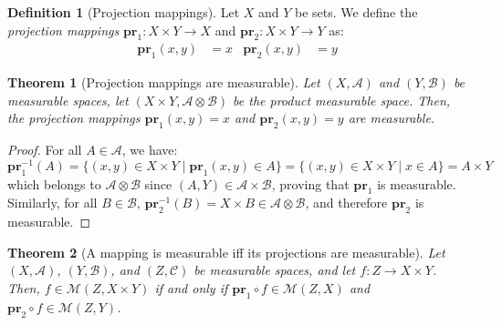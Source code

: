 \documentclass{article}
\newtheorem{theorem}{Theorem}[section]
\theoremstyle{definition}
\newtheorem{definition}{Definition}[section]
\theoremstyle{remark}
\theoremstyle{example}
\theoremstyle{notation}
\newcommand{\pr}{\mathbf{pr}}
\begin{document}
\begin{definition}[Projection mappings]
		Let $X$ and $Y$ be sets. We define the \textit{projection mappings} $\pr_1 : X \times Y \rightarrow X$ and $\pr_2 : X \times Y \rightarrow Y$ as:
		\begin{align*}
				\pr_1(x, y) &= x & \pr_2(x, y) &= y
		\end{align*}
\end{definition}

\begin{theorem}[Projection mappings are measurable]
		Let $(X, \mathcal{A})$ and $(Y, \mathcal{B})$ be measurable spaces, let $(X \times Y, \mathcal{A} \otimes \mathcal{B})$ be the product measurable space. Then, the projection mappings $\pr_1(x, y) = x$ and $\pr_2(x, y) = y$ are measurable.
\end{theorem}

\begin{proof}
		For all $A \in \mathcal{A}$, we have:
				$$\pr_1^{-1}(A) = \{(x, y) \in X \times Y \mid \pr_1(x, y) \in A\} = \{(x, y) \in X \times Y \mid x \in A\} = A \times Y$$
		which belongs to $\mathcal{A} \otimes \mathcal{B}$ since $(A, Y) \in \mathcal{A} \times \mathcal{B}$, proving that $\pr_1$ is measurable. Similarly, for all $B \in \mathcal{B}$, $\pr_2^{-1}(B) = X \times B \in \mathcal{A} \otimes \mathcal{B}$, and therefore $\pr_2$ is measurable.
\end{proof}

\begin{theorem}[A mapping is measurable iff its projections are measurable] %
		Let $(X, \mathcal{A})$, $(Y, \mathcal{B})$, and $(Z, \mathcal{C})$ be measurable spaces, and let $f : Z \rightarrow X \times Y$. Then, $f \in \mathcal{M}(Z, X \times Y)$ if and only if $\pr_1 \circ f \in \mathcal{M}(Z, X)$ and $\pr_2 \circ f \in \mathcal{M}(Z, Y)$.
\end{theorem}
\end{document}

